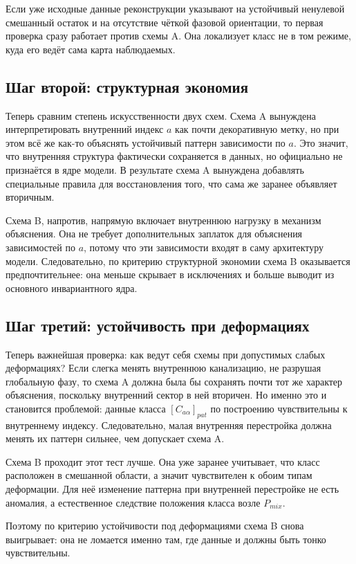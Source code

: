 \documentclass[12pt,a4paper]{article}
\begin{document}
Если уже исходные данные реконструкции указывают на устойчивый ненулевой смешанный остаток и на отсутствие чёткой фазовой ориентации, то первая проверка сразу работает против схемы A. Она локализует класс не в том режиме, куда его ведёт сама карта наблюдаемых.

\subsection{Шаг второй: структурная экономия}

Теперь сравним степень искусственности двух схем. Схема A вынуждена интерпретировать внутренний индекс \(a\) как почти декоративную метку, но при этом всё же как-то объяснять устойчивый паттерн зависимости по \(a\). Это значит, что внутренняя структура фактически сохраняется в данных, но официально не признаётся в ядре модели. В результате схема A вынуждена добавлять специальные правила для восстановления того, что сама же заранее объявляет вторичным.

Схема B, напротив, напрямую включает внутреннюю нагрузку в механизм объяснения. Она не требует дополнительных заплаток для объяснения зависимостей по \(a\), потому что эти зависимости входят в саму архитектуру модели. Следовательно, по критерию структурной экономии схема B оказывается предпочтительнее: она меньше скрывает в исключениях и больше выводит из основного инвариантного ядра.

\subsection{Шаг третий: устойчивость при деформациях}

Теперь важнейшая проверка: как ведут себя схемы при допустимых слабых деформациях? Если слегка менять внутреннюю канализацию, не разрушая глобальную фазу, то схема A должна была бы сохранять почти тот же характер объяснения, поскольку внутренний сектор в ней вторичен. Но именно это и становится проблемой: данные класса \([C_{a\alpha}]_{pat}\) по построению чувствительны к внутреннему индексу. Следовательно, малая внутренняя перестройка должна менять их паттерн сильнее, чем допускает схема A.

Схема B проходит этот тест лучше. Она уже заранее учитывает, что класс расположен в смешанной области, а значит чувствителен к обоим типам деформации. Для неё изменение паттерна при внутренней перестройке не есть аномалия, а естественное следствие положения класса возле \(P_{mix}\).

Поэтому по критерию устойчивости под деформациями схема B снова выигрывает: она не ломается именно там, где данные и должны быть тонко чувствительны.
\end{document}
